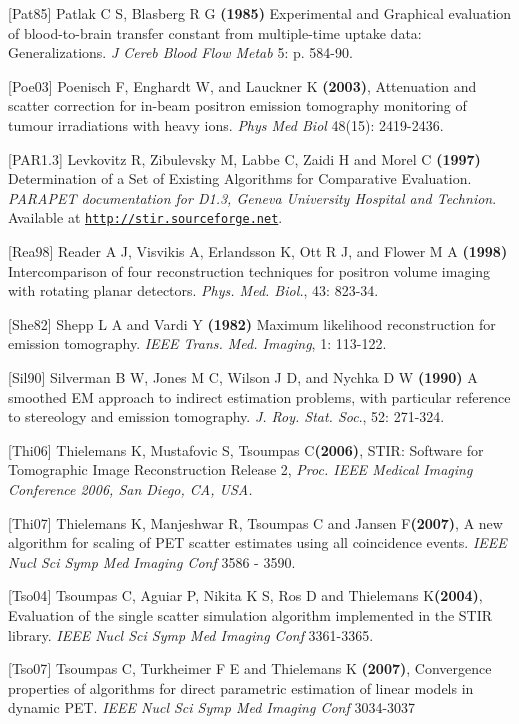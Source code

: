 \documentclass{article}
\def\R2Lurl#1#2{\mbox{\href{#1}{\tt #2}}}
\begin{document}
{{[}Pat85] Patlak C S, Blasberg R G \textbf{(1985)}  Experimental and Graphical evaluation of blood-to-brain 
transfer constant from multiple-time uptake data: Generalizations. \textit{J Cereb Blood Flow Metab} 5: p. 584-90.

{[}Poe03{]} Poenisch F, Enghardt W, and Lauckner K \textbf{(2003)}, 
Attenuation and scatter correction for in-beam positron emission tomography 
monitoring of tumour irradiations with heavy ions. \textit { Phys Med Biol } 48(15): 2419-2436. 

 {[}PAR1.3] Levkovitz R, Zibulevsky M, Labbe C, Zaidi H and Morel 
C \textbf{(1997)} Determination of a Set of Existing Algorithms for 
Comparative Evaluation. \textit{PARAPET documentation for D1.3, Geneva 
University Hospital and Technion}. \\
Available at \R2Lurl{http://stir.sourceforge.net }{http://stir.sourceforge.net}. 



 {[}Rea98] Reader A J, Visvikis A, Erlandsson K, Ott R J, and Flower 
M A \textbf{(1998)} Intercomparison of four reconstruction techniques 
for positron volume imaging with rotating planar detectors. \textit{Phys. 
Med. Biol.}, 43: 823-34.


{[}She82] Shepp L A and Vardi Y \textbf{(1982)} Maximum likelihood reconstruction 
for emission tomography. \textit{IEEE Trans. Med. Imaging}, 1: 113-122.


{[}Sil90] Silverman B W, Jones M C, Wilson J D, and Nychka D W \textbf{(1990)} 
A smoothed EM approach to indirect estimation problems, with 
particular reference to stereology and emission tomography. \textit{J. 
Roy. Stat. Soc}., 52: 271-324. 

{[}Thi06{]} Thielemans K, Mustafovic S, Tsoumpas C\textbf{(2006)},
STIR: Software for Tomographic Image
Reconstruction Release 2, 
\textit{Proc. IEEE Medical Imaging Conference 2006, San Diego, CA, USA.}

{[}Thi07{]} Thielemans K, Manjeshwar R, Tsoumpas C and Jansen F\textbf{(2007)}, 
A new algorithm for scaling of PET scatter estimates using all coincidence events. 
\textit { IEEE Nucl Sci Symp Med Imaging Conf } 3586 - 3590.

{[}Tso04{]} Tsoumpas C, Aguiar P, Nikita K S, Ros D and Thielemans K\textbf{(2004)}, 
Evaluation of the single scatter simulation algorithm implemented in the STIR library. 
\textit { IEEE Nucl Sci Symp Med Imaging Conf } 3361-3365.

{[}Tso07{]} Tsoumpas C, Turkheimer F E and Thielemans K  \textbf{(2007)}, 
Convergence properties of algorithms for direct parametric estimation of linear models in dynamic PET. 
\textit{IEEE Nucl Sci Symp Med Imaging Conf} 3034-3037

}
\end{document}
